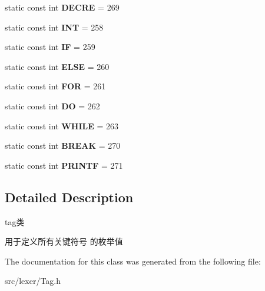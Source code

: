 \begin{DoxyCompactItemize}
static const int {\bfseries D\+E\+C\+RE} = 269
\item 
\mbox{\label{class_tag_a38242d609491f491ef9484f1679e7c3d}} 
static const int {\bfseries I\+NT} = 258
\item 
\mbox{\label{class_tag_a92a30db62631be16cad518d2bf59efaa}} 
static const int {\bfseries IF} = 259
\item 
\mbox{\label{class_tag_a4149b756bf94ef2d83f0d1de23ddee10}} 
static const int {\bfseries E\+L\+SE} = 260
\item 
\mbox{\label{class_tag_ac2ba80666f85af3bd539107c7121b16d}} 
static const int {\bfseries F\+OR} = 261
\item 
\mbox{\label{class_tag_a489769ae22c0fcf7c7842206a998abf8}} 
static const int {\bfseries DO} = 262
\item 
\mbox{\label{class_tag_a1ca35b43b49867c19d892103016b09b3}} 
static const int {\bfseries W\+H\+I\+LE} = 263
\item 
\mbox{\label{class_tag_a125fe413cdcec181606fa122a40f0026}} 
static const int {\bfseries B\+R\+E\+AK} = 270
\item 
\mbox{\label{class_tag_a85ff0086e29d3d6a8f6c78695df0bd52}} 
static const int {\bfseries P\+R\+I\+N\+TF} = 271
\end{DoxyCompactItemize}


\subsection{Detailed Description}
tag类 

用于定义所有关键符号 的枚举值 

The documentation for this class was generated from the following file\+:\begin{DoxyCompactItemize}
\item 
src/lexer/Tag.\+h\end{DoxyCompactItemize}
